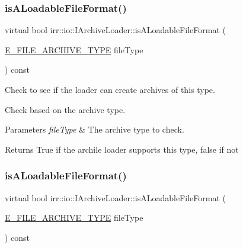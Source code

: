 \subsubsection{\texorpdfstring{is\+A\+Loadable\+File\+Format()}{isALoadableFileFormat()}\hspace{0.1cm}{\footnotesize\ttfamily [5/6]}}
{\footnotesize\ttfamily virtual bool irr\+::io\+::\+I\+Archive\+Loader\+::is\+A\+Loadable\+File\+Format (\begin{DoxyParamCaption}\item[{\hyperlink{namespaceirr_1_1io_adb3e3c445ec8e608ed1f0f93306da14f}{E\+\_\+\+F\+I\+L\+E\+\_\+\+A\+R\+C\+H\+I\+V\+E\+\_\+\+T\+Y\+PE}}]{file\+Type }\end{DoxyParamCaption}) const\hspace{0.3cm}{\ttfamily [pure virtual]}}



Check to see if the loader can create archives of this type. 

Check based on the archive type. 
\begin{DoxyParams}{Parameters}
{\em file\+Type} & The archive type to check. \\
\hline
\end{DoxyParams}
\begin{DoxyReturn}{Returns}
True if the archile loader supports this type, false if not 
\end{DoxyReturn}
\mbox{\label{classirr_1_1io_1_1IArchiveLoader_af60c081f27ab941702a4a32dfe482c05}} 
\subsubsection{\texorpdfstring{is\+A\+Loadable\+File\+Format()}{isALoadableFileFormat()}\hspace{0.1cm}{\footnotesize\ttfamily [6/6]}}
{\footnotesize\ttfamily virtual bool irr\+::io\+::\+I\+Archive\+Loader\+::is\+A\+Loadable\+File\+Format (\begin{DoxyParamCaption}\item[{\hyperlink{namespaceirr_1_1io_adb3e3c445ec8e608ed1f0f93306da14f}{E\+\_\+\+F\+I\+L\+E\+\_\+\+A\+R\+C\+H\+I\+V\+E\+\_\+\+T\+Y\+PE}}]{file\+Type }\end{DoxyParamCaption}) const\hspace{0.3cm}{\ttfamily [pure virtual]}}



